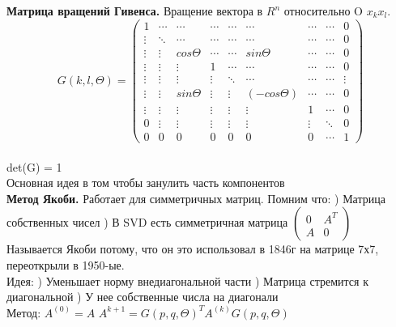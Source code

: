     \textbf{Матрица вращений Гивенса.} Вращение вектора в \(R^n\) относительно O \(x_k x_l\).
    \[
    G(k, l, \Theta) = 
    \begin{pmatrix}
    1      & \cdots & \cdots     &\cdots  & \cdots &\cdots & \cdots & \cdots &0  \\
    \vdots & \ddots & \cdots     &\cdots  & \cdots & \cdots &\cdots & \cdots & 0\\
    \vdots & \vdots & cos \Theta & \cdots &  \cdots & sin \Theta & \cdots & \cdots & 0\\
    \vdots & \vdots & \vdots     & 1      & \cdots & \cdots & \cdots & \cdots & 0\\
    \vdots & \vdots & \vdots     & \vdots & \ddots & \cdots & \cdots & \cdots & \vdots \\

    \vdots & \vdots & sin \Theta    & \vdots & \vdots & (-cos \Theta) & \cdots & \cdots & 0 \\
        \vdots & \vdots & \vdots     & \vdots & \vdots & \vdots & 1 & \cdots & 0 \\
    0 & \vdots & \vdots & \vdots & \vdots & \vdots & \vdots & \ddots & 0 \\
        0 & 0 & 0 & 0 &0 & 0 & 0 & \cdots & 1
    \end{pmatrix}
    \] \\
    det(G) = 1 \\
    Основная идея в том чтобы занулить часть компонентов\\
    \textbf{Метод Якоби.} 
    Работает для симметричных матриц. Помним что:
    ) Матрица собственных чисел 
    ) В SVD есть симметричная матрица $\begin{pmatrix}
        0 & A^T \\
        A& 0
    \end{pmatrix}$\\
    Называется Якоби потому, что он это использовал в 1846г на матрице 7х7, переоткрыли в 1950-ые.\\

    Идея:
    ) Уменьшает норму внедиагональной части
    ) Матрица стремится к диагональной
    ) У нее собственные числа на диагонали \\
    

    Метод:
    \newline $A^{(0)} = A$ 
    \newline $A^{k+1}=G(p,q,\Theta)^TA^{(k)}G(p,q,\Theta) $\\

